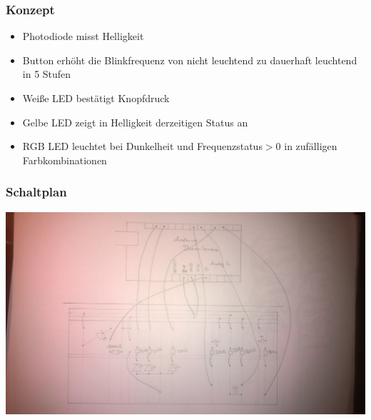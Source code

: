 \documentclass[hyperref={pdfpagelabels=false}]{beamer}
\begin{document}
 \begin{frame}
 \frametitle{Konzept}
 \begin{itemize}
  \item Photodiode misst Helligkeit
  \item Button erhöht die Blinkfrequenz von nicht leuchtend zu dauerhaft leuchtend in 5 Stufen
  \item Weiße LED bestätigt Knopfdruck
  \item Gelbe LED zeigt in Helligkeit derzeitigen Status an
  \item RGB LED leuchtet bei Dunkelheit und Frequenzstatus$>0$ in zufälligen Farbkombinationen
 \end{itemize}

 \end{frame}

 
 \begin{frame}
  \frametitle{Schaltplan}
  \includegraphics[scale=0.15]{Schaltung.jpg}
 \end{frame}
\end{document}
